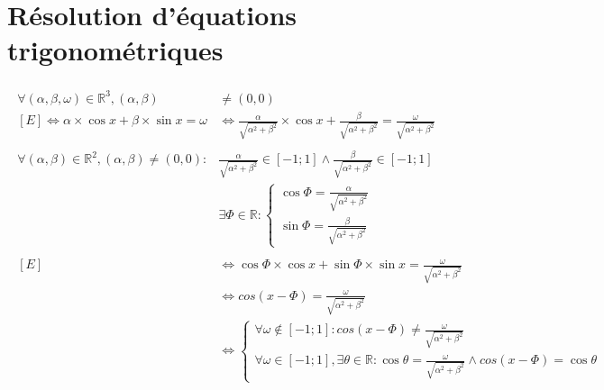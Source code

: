 \documentclass[a4paper, 12pt]{article}
\begin{document}
	\section{Résolution d'équations trigonométriques}
	\begin{gather*}
		\begin{split}
			\forall \left( \alpha,\beta,\omega \right) \in\mathbb{R}^3, \left( \alpha,\beta \right) &\neq \left( 0,0 \right) \\
			\left[E\right]\Leftrightarrow\alpha\times\cos{x} + \beta\times\sin{x} = \omega &\Leftrightarrow \frac{\alpha}{\sqrt{\alpha^2+\beta^2}}\times\cos{x} + \frac{\beta}{\sqrt{\alpha^2+\beta^2}} = \frac{\omega}{\sqrt{\alpha^2+\beta^2}}\\
			\\
			\forall\left(\alpha,\beta\right)\in\mathbb{R}^2, \left(\alpha, \beta\right)\neq\left(0,0\right):&\frac{\alpha}{\sqrt{\alpha^2+\beta^2}}\in\left[-1; 1\right]\wedge\frac{\beta}{\sqrt{\alpha^2+\beta^2}}\in\left[-1; 1\right]\\
			&\exists\varPhi\in\mathbb{R}:
			\begin{cases}
				\cos{\varPhi} = \frac{\alpha}{\sqrt{\alpha^2+\beta^2}}\\
				\sin{\varPhi} = \frac{\beta}{\sqrt{\alpha^2+\beta^2}}
			\end{cases}\\
			\\
			\left[E\right]&\Leftrightarrow\cos{\varPhi}\times\cos{x} + \sin{\varPhi}\times\sin{x} = \frac{\omega}{\sqrt{\alpha^2+\beta^2}}\\
			&\Leftrightarrow cos\left(x-\varPhi\right) = \frac{\omega}{\sqrt{\alpha^2+\beta^2}}\\
			&\Leftrightarrow
			\begin{cases}
				\forall\omega\notin\left[-1; 1\right]: cos\left(x-\varPhi\right) \neq \frac{\omega}{\sqrt{\alpha^2+\beta^2}}\\
				\forall\omega\in\left[-1; 1\right], \exists\theta\in\mathbb{R}: \cos{\theta} = \frac{\omega}{\sqrt{\alpha^2+\beta^2}}\wedge cos\left(x-\varPhi\right) = \cos{\theta}
			\end{cases}
		\end{split}
	\end{gather*}
\end{document}
